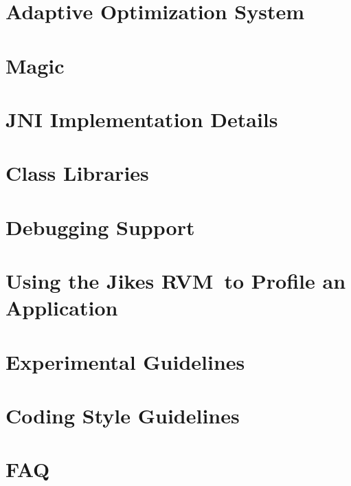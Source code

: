 \documentclass{article}
\newcommand{\jrvm}{Jikes RVM}
\begin{document}
\T \newpage
\section{Adaptive Optimization System}
\label{section:aosdetails}


\T \newpage
\section{Magic}


\T \newpage
\section{JNI Implementation Details}
\label{section:jni}


\T \newpage
\section{Class Libraries}
\label{section:libraries}


\T \newpage
\section{Debugging Support}
\label{section:debugging}


\T \newpage
\section{Using the \jrvm\ to Profile an Application}


%

\T \newpage
\section{Experimental Guidelines}


\T \newpage
\section{Coding Style Guidelines}


\T \newpage
\section{FAQ}

\end{document}
